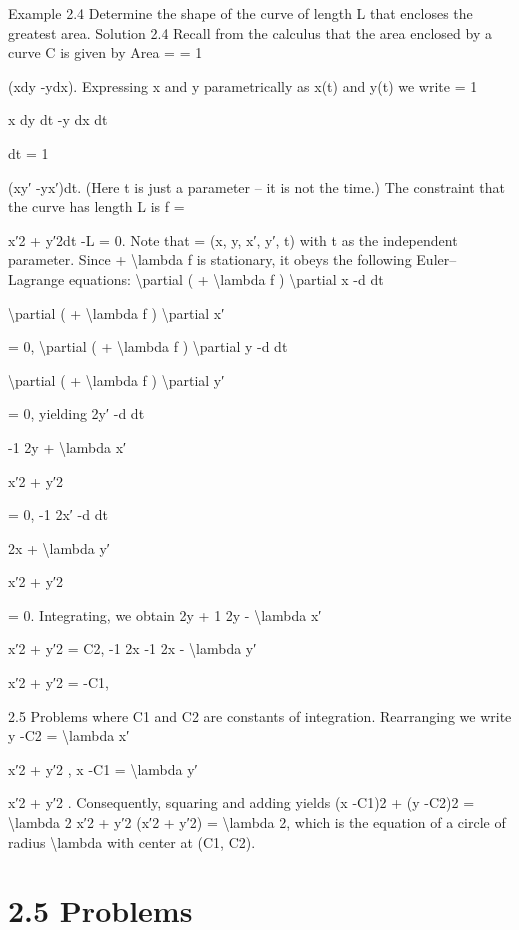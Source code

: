 \begin{example}
Example 2.4 Determine the shape of the curve of length L that encloses the
greatest area.
Solution 2.4 Recall from the calculus that the area enclosed by a curve C is
given by
Area =  = 1

(xdy -ydx).
Expressing x and y parametrically as x(t) and y(t) we write
= 1


x dy
dt -y dx
dt

dt = 1

(xy′ -yx′)dt.
(Here t is just a parameter -- it is not the time.) The constraint that the curve
has length L is
f =


x′2 + y′2dt -L = 0.
Note that  = (x, y, x′, y′, t) with t as the independent parameter. Since
+ \textbackslash{}lambda f is stationary, it obeys the following Euler--Lagrange equations:
\textbackslash{}partial ( + \textbackslash{}lambda f )
\textbackslash{}partial x
-d
dt

\textbackslash{}partial ( + \textbackslash{}lambda f )
\textbackslash{}partial x′

= 0,
\textbackslash{}partial ( + \textbackslash{}lambda f )
\textbackslash{}partial y
-d
dt

\textbackslash{}partial ( + \textbackslash{}lambda f )
\textbackslash{}partial y′

= 0,
yielding
2y′ -d
dt

-1
2y +
\textbackslash{}lambda x′

x′2 + y′2

= 0,
-1
2x′ -d
dt

2x +
\textbackslash{}lambda y′

x′2 + y′2

= 0.
Integrating, we obtain
2y + 1
2y -
\textbackslash{}lambda x′

x′2 + y′2 = C2,
-1
2x -1
2x -
\textbackslash{}lambda y′

x′2 + y′2 = -C1,

2.5
Problems
where C1 and C2 are constants of integration. Rearranging we write
y -C2 =
\textbackslash{}lambda x′

x′2 + y′2 ,
x -C1 =
\textbackslash{}lambda y′

x′2 + y′2 .
Consequently, squaring and adding yields
(x -C1)2 + (y -C2)2 =
\textbackslash{}lambda 2
x′2 + y′2 (x′2 + y′2) = \textbackslash{}lambda 2,
which is the equation of a circle of radius \textbackslash{}lambda  with center at (C1, C2).
\end{example}

\section*{2.5  Problems}

